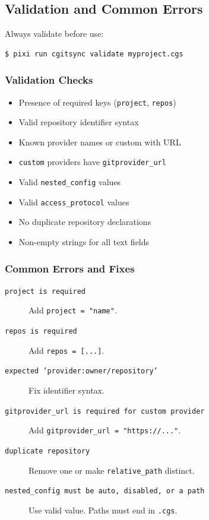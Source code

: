 \subsection{Validation and Common Errors}
\label{subsec:cgs-validation}

Always validate before use:

\begin{lstlisting}[language=bash]
$ pixi run cgitsync validate myproject.cgs
\end{lstlisting}

\subsubsection{Validation Checks}

\begin{itemize}
  \item Presence of required keys (\texttt{project}, \texttt{repos})
  \item Valid repository identifier syntax
  \item Known provider names or custom with URL
  \item \texttt{custom} providers have \texttt{gitprovider\_url}
  \item Valid \texttt{nested\_config} values
  \item Valid \texttt{access\_protocol} values
  \item No duplicate repository declarations
  \item Non-empty strings for all text fields
\end{itemize}

\subsubsection{Common Errors and Fixes}

\begin{description}
  \item[\texttt{project is required}] Add \texttt{project = "name"}.
  \item[\texttt{repos is required}] Add \texttt{repos = [...]}. 
  \item[\texttt{expected 'provider:owner/repository'}] Fix identifier syntax.
  \item[\texttt{gitprovider\_url is required for custom provider}]
        Add \texttt{gitprovider\_url = "https://..."}.
  \item[\texttt{duplicate repository}] Remove one or make \texttt{relative\_path}
        distinct.
  \item[\texttt{nested\_config must be auto, disabled, or a path}]
        Use valid value. Paths must end in \texttt{.cgs}.
\end{description}

